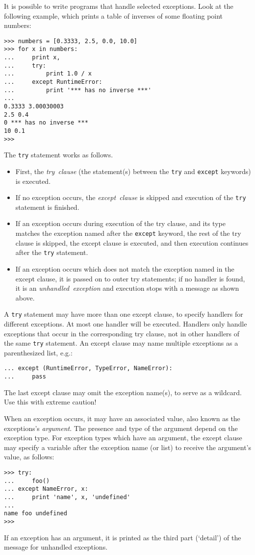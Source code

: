 It is possible to write programs that handle selected exceptions.
Look at the following example, which prints a table of inverses of
some floating point numbers:
\bcode\begin{verbatim}
>>> numbers = [0.3333, 2.5, 0.0, 10.0]
>>> for x in numbers:
...     print x,
...     try:
...         print 1.0 / x
...     except RuntimeError:
...         print '*** has no inverse ***'
... 
0.3333 3.00030003
2.5 0.4
0 *** has no inverse ***
10 0.1
>>> 
\end{verbatim}\ecode
The {\tt try} statement works as follows.
\begin{itemize}
\item
First, the
{\em try\ clause}
(the statement(s) between the {\tt try} and {\tt except} keywords) is
executed.
\item
If no exception occurs, the
{\em except\ clause}
is skipped and execution of the {\tt try} statement is finished.
\item
If an exception occurs during execution of the try clause, and its
type matches the exception named after the {\tt except} keyword, the
rest of the try clause is skipped, the except clause is executed, and
then execution continues after the {\tt try} statement.
\item
If an exception occurs which does not match the exception named in the
except clause, it is passed on to outer try statements; if no handler is
found, it is an
{\em unhandled\ exception}
and execution stops with a message as shown above.
\end{itemize}
A {\tt try} statement may have more than one except clause, to specify
handlers for different exceptions.
At most one handler will be executed.
Handlers only handle exceptions that occur in the corresponding try
clause, not in other handlers of the same {\tt try} statement.
An except clause may name multiple exceptions as a parenthesized list,
e.g.:
\bcode\begin{verbatim}
... except (RuntimeError, TypeError, NameError):
...     pass
\end{verbatim}\ecode
The last except clause may omit the exception name(s), to serve as a
wildcard.
Use this with extreme caution!

When an exception occurs, it may have an associated value, also known as
the exceptions's
{\em argument}.
The presence and type of the argument depend on the exception type.
For exception types which have an argument, the except clause may
specify a variable after the exception name (or list) to receive the
argument's value, as follows:
\bcode\begin{verbatim}
>>> try:
...     foo()
... except NameError, x:
...     print 'name', x, 'undefined'
... 
name foo undefined
>>> 
\end{verbatim}\ecode
If an exception has an argument, it is printed as the third part
(`detail') of the message for unhandled exceptions.

